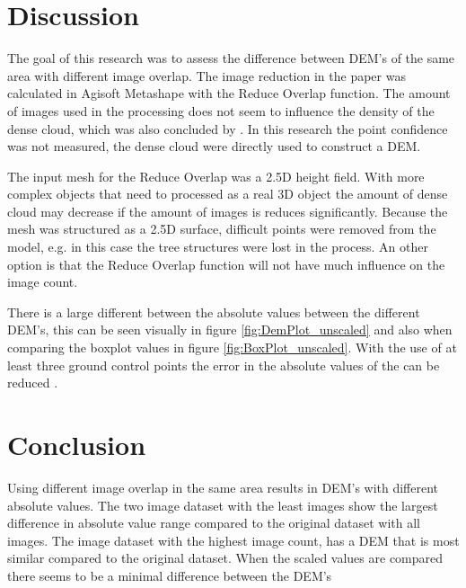 \documentclass{isprs} %
\begin{document}
\section{Discussion}
The goal of this research was to assess the difference between DEM's of the same area with different image overlap. 
The image reduction in the paper was calculated in Agisoft Metashape with the Reduce Overlap function.
The amount of images used in the processing does not seem to influence the density of the dense cloud, which was also concluded by \citet{EffectofUABimgcamover}.
In this research the point confidence was not measured, the dense cloud were directly used to construct a DEM.

The input mesh for the Reduce Overlap was a 2.5D height field. 
With more complex objects that need to processed as a real 3D object the amount of dense cloud may decrease if the amount of images is reduces significantly.
Because the mesh was structured as a 2.5D surface, difficult points were removed from the model, e.g. in this case the tree structures were lost in the process.
An other option is that the Reduce Overlap function will not have much influence on the image count.

There is a large different between the absolute values between the different DEM's, this can be seen visually in figure \ref{fig:DemPlot_unscaled} and also when comparing the boxplot values in figure \ref{fig:BoxPlot_unscaled}.
With the use of at least three ground control points the error in the absolute values of the can be reduced \citep{AssessingUAVGCPS, GCPbetterAccuracy}.


\section{Conclusion}
Using different image overlap in the same area results in DEM's with different absolute values.
The two image dataset with the least images show the largest difference in absolute value range compared to the original dataset with all images. 
The image dataset with the highest image count, has a DEM that is most similar compared to the original dataset.
When the scaled values are compared there seems to be a minimal difference between the DEM's


\sloppy




{
	\begin{spacing}{1.17}
		\normalsize
	\end{spacing}
}



\vspace{1cm}
\end{document}
